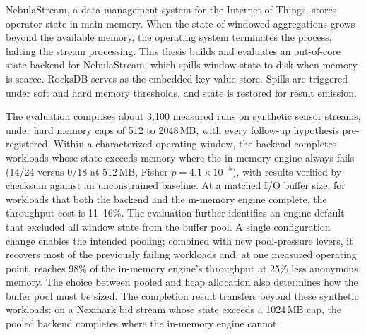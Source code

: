 NebulaStream, a data management system for the Internet of Things, stores operator state in main memory.
When the state of windowed aggregations grows beyond the available memory, the operating system terminates the process, halting the stream processing.
This thesis builds and evaluates an out-of-core state backend for NebulaStream, which spills window state to disk when memory is scarce.
RocksDB serves as the embedded key-value store. Spills are triggered under soft and hard memory thresholds, and state is restored for result emission.

The evaluation comprises about 3{,}100 measured runs on synthetic sensor streams, under hard memory caps of 512 to 2048\,MB, with every follow-up hypothesis pre-registered.
Within a characterized operating window, the backend completes workloads whose state exceeds memory where the in-memory engine always fails (14/24 versus 0/18 at 512\,MB, Fisher $p = 4.1 \times 10^{-5}$), with results verified by checksum against an unconstrained baseline.
At a matched I/O buffer size, for workloads that both the backend and the in-memory engine complete, the throughput cost is 11--16\%.
The evaluation further identifies an engine default that excluded all window state from the buffer pool.
A single configuration change enables the intended pooling; combined with new pool-pressure levers, it recovers most of the previously failing workloads and, at one measured operating point, reaches 98\% of the in-memory engine's throughput at 25\% less anonymous memory.
The choice between pooled and heap allocation also determines how the buffer pool must be sized.
The completion result transfers beyond these synthetic workloads: on a Nexmark bid stream whose state exceeds a 1024\,MB cap, the pooled backend completes where the in-memory engine cannot.
